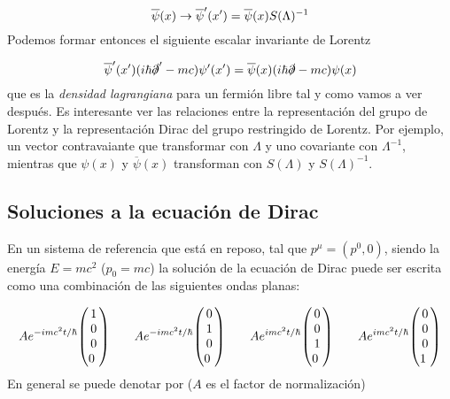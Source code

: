\begin{equation}
	\overline{\psi} (x) \rightarrow \overline{\psi}'(x') = \overline{\psi}(x) S(\Lambda)^{-1}
\end{equation}
Podemos formar entonces el siguiente escalar invariante de Lorentz 

\begin{equation}
	\overline{\psi}'(x') (i\hbar \slashed{\partial}' - mc) \psi'(x') = \overline{\psi}(x)(i\hbar \slashed{\partial} - mc)  \psi(x)
\end{equation}
que es la \textit{densidad lagrangiana} para un fermión libre tal y como vamos a ver después. Es interesante ver las relaciones entre la representación del grupo de Lorentz y la representación Dirac del grupo restringido de Lorentz. Por ejemplo, un vector contravaiante que transformar con $\Lambda$ y uno covariante con $\Lambda^{-1}$, mientras que $\psi(x)$ y $\overline{\psi}(x)$ transforman con $S(\Lambda)$ y $S(\Lambda)^{-1}$.


\subsection{Soluciones a la ecuación de Dirac}

En un sistema de referencia que está en reposo, tal que $p^\mu=(p^0,0)$, siendo la energía $E=mc^2$ ($p_0=mc$) la solución de la ecuación de Dirac puede ser escrita como una combinación de las siguientes ondas planas:

\begin{equation}
	A	e^{-imc^2t/\hbar} \mqty(1\\0\\0\\0 \ ) \qquad 	Ae^{-imc^2t/\hbar} \mqty(0\\1\\0\\0\ ) \qquad 	Ae^{imc^2t/\hbar} \mqty(0\\0\\1\\0 \ ) \qquad Ae^{imc^2t/\hbar} \mqty(0\\0\\0\\1 \ )
\end{equation}
En general se puede denotar por ($A$ es el factor de normalización) 

